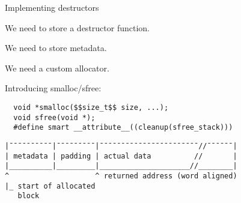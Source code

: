 \documentclass[10pt]{beamer}
\begin{document}
\begin{frame}[fragile]{Implementing destructors}

  We need to store a destructor function.

  We need to store metadata.

  We need a custom allocator.

  Introducing smalloc/sfree:

  \begin{lstlisting}
  void *smalloc($$size_t$$ size, ...);
  void sfree(void *);
  #define smart __attribute__((cleanup(sfree_stack)))
  \end{lstlisting}

  \begin{verbatim}
|¯¯¯¯¯¯¯¯¯¯|¯¯¯¯¯¯¯¯¯|¯¯¯¯¯¯¯¯¯¯¯¯¯¯¯¯¯¯¯¯¯¯¯//¯¯¯¯¯¯|
| metadata | padding | actual data          //       |
|__________|_________|_____________________//________|
^                    ^ returned address (word aligned)
|_ start of allocated
   block
  \end{verbatim}

\end{frame}
\end{document}
